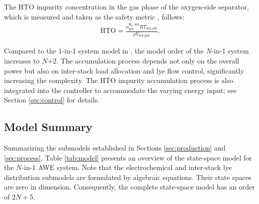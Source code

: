 \documentclass[review,3p,10pt]{elsarticle}
\begin{document}
The HTO impurity concentration in the gas phase of the oxygen-side separator, which is measured and taken as the safety metric \cite{david2020dynamic,trinke2018hydrogen,qi2021pressure}, follows:
\begin{align}
  \text{HTO} = \frac{n^{\text{H}_2,\text{sep}}_{\text{gas}} R T_{\text{sep,out}}} {\rho V_{\text{sep,gas}}}. \label{eq:defhto}
\end{align}

Compared to the 1-in-1 system model in \cite{qi2021pressure}, the model order of the $N$-in-1 system increases to $N$+2. The accumulation process depends not only on the overall power but also on inter-stack load allocation and lye flow control, significantly increasing the complexity. 
The HTO impurity accumulation process is also integrated into the controller to accommodate the varying energy input; %
see Section \ref{sec:control} for details.

\subsection{Model Summary}
\label{sec:modelsummary}

Summarizing the %
submodels established in Sections \ref{sec:production} and \ref{sec:process}, %
Table \ref{tab:model} presents an overview of the state-space model for the $N$-in-1 AWE system. Note that the electrochemical and inter-stack lye distribution submodels are formulated by algebraic equations. Their state spaces are zero in dimension. Consequently, the complete state-space model has an order of $2N+5$.
\end{document}
